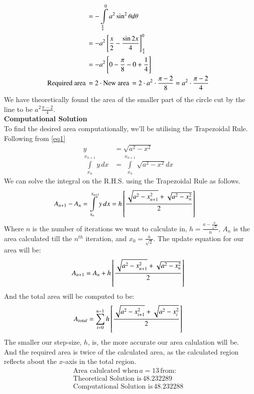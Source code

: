 \documentclass[journal]{IEEEtran}
\begin{document}
\begin{align}
	&= -\int\limits_{\frac{\pi}{4}}^{0} a^2 \sin^2\theta d\theta\\
	&= -a^2{}\left[\frac{x}{2}-\frac{\sin2x}{4}\right]_{\frac{\pi}{4}}^{0}\\
	&= -a^2{}\left[0 -\frac{\pi}{8} - 0 + \frac{1}{4}\right]\\
	\text{Required area}\, &= 2\cdot\text{New area} \, = 2\cdot a^2\cdot\frac{\pi-2}{8} = a^2\cdot\frac{\pi-2}{4}
\end{align}
We have theoretically found the area of the smaller part of the circle cut by the line to be $a^2 \frac{\pi-2}{4}$.\\
\textbf{Computational Solution}\\
To find the desired area computationally, we'll be utilising the Trapezoidal Rule.\\
Following from \ref{eq1}
\begin{align}
	y &= \sqrt{a^2-x^2} \nonumber\\
	\int\limits_{x_n}^{x_{n+1}} y \, dx &= \int\limits_{x_n}^{x_{n+1}} \sqrt{a^2-x^2} dx
\end{align}
We can solve the integral on the R.H.S. using the Trapezoidal Rule as follows.
\begin{align}
	A_{n+1}-A_{n} = 	\int\limits_{x_n}^{x_{n+1}} y \, dx &= h{}\left[\frac{\sqrt{a^2-x_{n+1}^2} + \sqrt{a^2-x_n^2}}{2}\right]
\end{align}
Where $n$ is the number of iterations we want to calculate in, $h = \frac{a-\frac{a}{\sqrt{2}}}{n}$, $A_{n}$ is the area calculated till the $n^{th}$ iteration, and $x_0 = \frac{a}{\sqrt{2}}$.
The update equation for our area will be:
\begin{align}
	A_{n+1} = A_{n} +  h{}\left[\frac{\sqrt{a^2-x_{n+1}^2} + \sqrt{a^2-x_n^2}}{2}\right]
\end{align}
And the total area will be computed to be:
\begin{align}
	A_{total} = \sum\limits_{i = 0}^{n-1} h{}\left[\frac{\sqrt{a^2-x_{i+1}^2} + \sqrt{a^2-x_i^2}}{2}\right]
\end{align}
The smaller our step-size, $h$, is, the more accurate our area calulation will be.\\
And the required area is twice of the calculated area, as the calculated region reflects about the $x$-axis in the total region.
\begin{align*}
	\text{Area calulcated when}\, a=13 \,\text{from:}\\
	\text{Theoretical Solution is}\, 48.232289\\
	\text{Computational Solution is}\, 48.232288
\end{align*}
\end{document}
